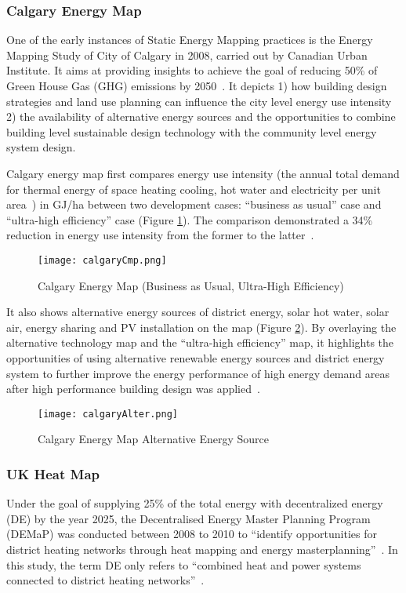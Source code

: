 \documentclass[hidelinks,12pt]{article}
\newcommand{\fref}[1]{Figure \ref{#1}}
\begin{document}
\subsubsection{Calgary Energy Map}
One of the early instances of Static Energy Mapping practices is the
Energy Mapping Study of City of Calgary in 2008, carried out by
Canadian Urban Institute. It aims at providing insights to achieve
the goal of reducing 50\% of Green House Gas (GHG) emissions by
2050~\cite{aacip2009}. It depicts 1) how building design strategies
and land use planning can influence the city level energy use
intensity 2) the availability of alternative energy sources and the
opportunities to combine building level sustainable design technology
with the community level energy system design. 

Calgary energy map first compares energy use intensity (the annual
total demand for thermal energy of space heating cooling, hot water
and electricity per unit area~\cite{aacip2009}) in GJ/ha between two
development cases: ``business as usual'' case and ``ultra-high
efficiency'' case (\fref{fig:calgaryCmp}). The comparison demonstrated
a 34\% reduction in energy use intensity from the former to the
latter~\cite{aacip2009}.

\begin{figure}[h!]
  \centering
  \texttt{[image: calgaryCmp.png]}
  \caption{Calgary Energy Map (Business as Usual, Ultra-High
    Efficiency)~\cite{aacip2009}}
  \label{fig:calgaryCmp}
\end{figure}

It also shows alternative energy sources of district energy, solar hot
water, solar air, energy sharing and PV installation on the map
(\fref{fig:calgaryAlter}). By overlaying the alternative technology
map and the ``ultra-high efficiency'' map, it highlights the
opportunities of using alternative renewable energy sources and
district energy system to further improve the energy performance of
high energy demand areas after high performance building design was
applied~\cite{aacip2009}.

\begin{figure}[h!]
  \centering
  \texttt{[image: calgaryAlter.png]}
  \caption{Calgary Energy Map Alternative Energy Source~\cite{aacip2009}}
  \label{fig:calgaryAlter}
\end{figure}

\subsubsection{UK Heat Map}
Under the goal of supplying 25\% of the total energy with
decentralized energy (DE) by the year 2025, the Decentralised Energy
Master Planning Program (DEMaP) was conducted between 2008 to 2010 to
``identify opportunities for district heating networks through heat
mapping and energy masterplanning''~\cite{londonHeatMap}. In this
study, the term DE only refers to ``combined heat and power systems
connected to district heating
networks''~\cite{decentralHeatMap2011}. 
\end{document}

